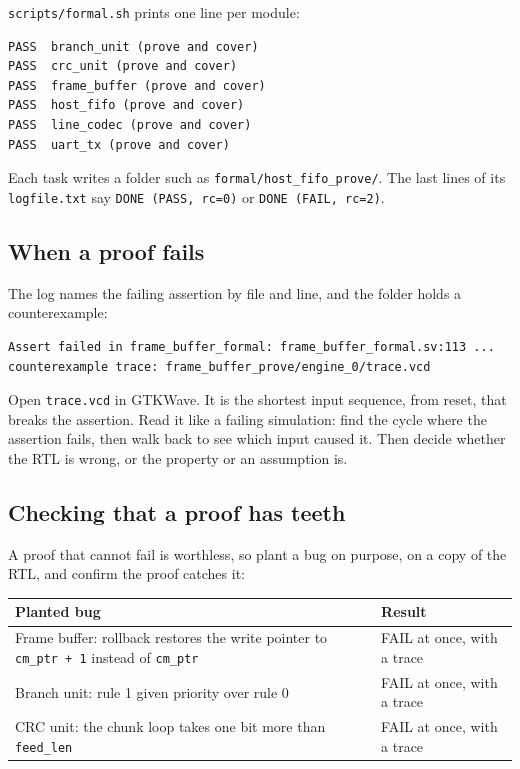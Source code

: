 \documentclass[11pt,a4paper]{article}
\newcommand{\file}[1]{\texttt{#1}}
\begin{document}
\file{scripts/formal.sh} prints one line per module:

\begin{lstlisting}
PASS  branch_unit (prove and cover)
PASS  crc_unit (prove and cover)
PASS  frame_buffer (prove and cover)
PASS  host_fifo (prove and cover)
PASS  line_codec (prove and cover)
PASS  uart_tx (prove and cover)
\end{lstlisting}

Each task writes a folder such as \file{formal/host\_fifo\_prove/}. The last lines of its \file{logfile.txt} say \texttt{DONE (PASS, rc=0)} or \texttt{DONE (FAIL, rc=2)}.

\subsection{When a proof fails}

The log names the failing assertion by file and line, and the folder holds a counterexample:
\begin{lstlisting}
Assert failed in frame_buffer_formal: frame_buffer_formal.sv:113 ...
counterexample trace: frame_buffer_prove/engine_0/trace.vcd
\end{lstlisting}
Open \file{trace.vcd} in GTKWave. It is the shortest input sequence, from reset, that breaks the assertion. Read it like a failing simulation: find the cycle where the assertion fails, then walk back to see which input caused it. Then decide whether the RTL is wrong, or the property or an assumption is.

\subsection{Checking that a proof has teeth}

A proof that cannot fail is worthless, so plant a bug on purpose, on a copy of the RTL, and confirm the proof catches it:

\begin{center}
\begin{tabularx}{\linewidth}{@{}LL@{}}
\toprule
Planted bug & Result \\
\midrule
Frame buffer: rollback restores the write pointer to \texttt{cm\_ptr + 1} instead of \texttt{cm\_ptr} & FAIL at once, with a trace \\
Branch unit: rule 1 given priority over rule 0 & FAIL at once, with a trace \\
CRC unit: the chunk loop takes one bit more than \texttt{feed\_len} & FAIL at once, with a trace \\
\bottomrule
\end{tabularx}
\end{center}
\end{document}
